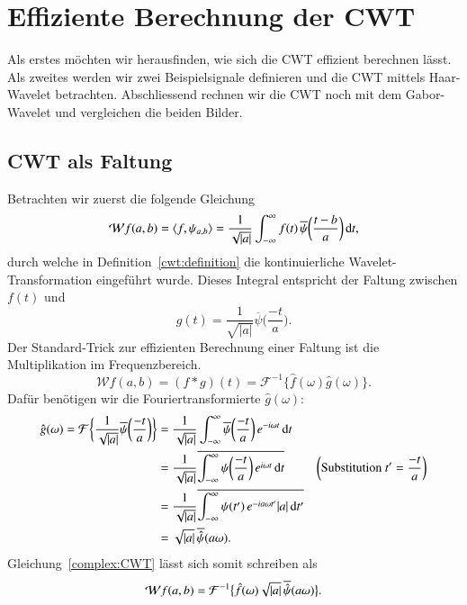 \section{Effiziente Berechnung der CWT}
Als erstes möchten wir herausfinden, wie sich die CWT effizient berechnen lässt.
Als zweites werden wir zwei Beispielsignale definieren und die CWT mittels Haar-Wavelet betrachten.
Abschliessend rechnen wir die CWT noch mit dem Gabor-Wavelet und vergleichen die beiden Bilder.

\subsection{CWT als Faltung}
Betrachten wir zuerst die folgende Gleichung
\begin{equation}
\Wave f (a,b)
=
\langle f,\psi_{a,b}\rangle
=
\frac{1}{\sqrt{|a|}}\int_{-\infty}^\infty f(t)\,
	\overline{\psi}\biggl(\frac{t-b}{a}\biggr)\,\mathrm{d}t,\label{complex:CWT}
\end{equation}
durch welche in Definition~\ref{cwt:definition} die kontinuierliche Wavelet-Transformation eingeführt wurde.
Dieses Integral entspricht der Faltung zwischen $f(t)$ und 
\begin{equation} 
    g(t) 
    = \frac{1}{\sqrt{|a|}} \overline\psi\biggl(\frac{-t}{a}\biggr).
\end{equation}
Der Standard-Trick zur effizienten Berechnung einer Faltung ist die Multiplikation im Frequenzbereich.
\begin{equation} 
\mathcal{W}f (a,b) = (f*g)(t) = \mathcal{F}^{-1}\biggl\lbrace\hat f(\omega) \hat g (\omega) \biggr\rbrace.
\end{equation}
Dafür benötigen wir die Fouriertransformierte $\hat g (\omega)$:
\begin{align*}
	\hat g (\omega) = 
    \Four\,\biggl\lbrace \frac{1}{\sqrt{|a|}} \overline\psi \biggl(\frac{-t}{a}\biggr) \biggr\rbrace 
	&= \frac{1}{\sqrt{|a|}} \int_{-\infty}^{\infty}\overline\psi\biggl(\frac{-t}{a}\biggr) \, e^{-i\omega t}\,\mathrm{d}t\\
	&= \frac{1}{\sqrt{|a|}} \overline{\int_{-\infty}^{\infty}\psi \biggl(\frac{-t}{a}\biggr) \, e^{i\omega t}\,\mathrm{d}t}  
    & \biggl(\text{Substitution } t' = \frac{-t}{a}\biggr)\\
	&= \frac{1}{\sqrt{|a|}} \overline{\int_{-\infty}^{\infty}\psi(t') \, e^{-ia\omega t'} |a|\,\mathrm{d}t'}\\
	&= \sqrt{|a|} \, \overline{\hat{\psi}}(a\omega).
\end{align*}
Gleichung~\eqref{complex:CWT} lässt sich somit schreiben als
\begin{equation}
\Wave f(a,b)
= \mathcal{F}^{-1}\bigl\lbrace\hat{f}(\omega) \sqrt{|a|}\, \overline{\hat{\psi}}(a\omega)\bigr\rbrace. \label{complex:fcwt}
\end{equation}

